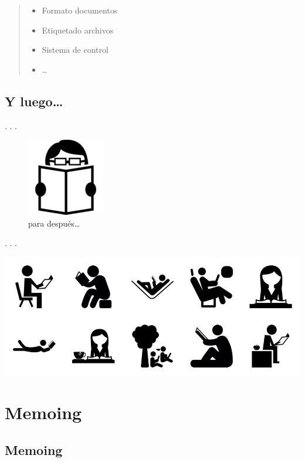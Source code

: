 \hypertarget{column2}{}
\begin{quote}
\begin{itemize}
\tightlist
\item
  Formato documentos
\item
  Etiquetado archivos
\item
  Sistema de control
\item
  \ldots{}
\end{itemize}
\end{quote}

\hypertarget{y-luego}{%
\subsection{Y luego\ldots{}}\label{y-luego}}

. . .

\begin{figure}
\centering
\includegraphics{imagenes-cuali/reader-4.png}
\caption{para después\ldots{}}
\end{figure}

. . .

\includegraphics{imagenes-cuali/readers.jpg}

\hypertarget{memoing-1}{%
\section{Memoing}\label{memoing-1}}

\hypertarget{memoing-3}{%
\subsection{Memoing}\label{memoing-3}}


